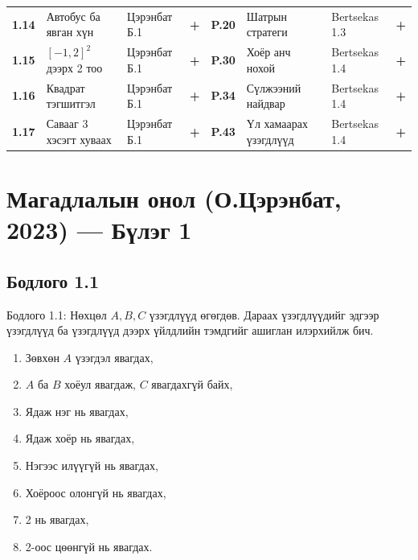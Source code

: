 \documentclass[11pt,a4paper]{article}
\newcommand{\checked}{\textcolor{success}{\textbf{+}}}
\begin{document}
{\begin{center}
\begin{tabularx}{\textwidth}{@{}c X l c | c X l c@{}}
\textbf{1.14} & Автобус ба явган хүн & Цэрэнбат Б.1 & \checked & \textbf{P.20} & Шатрын стратеги & Bertsekas 1.3 & \checked \\
\textbf{1.15} & \texorpdfstring{$[-1,2]^2$}{[-1,2]^2} дээрх 2 тоо & Цэрэнбат Б.1 & \checked & \textbf{P.30} & Хоёр анч нохой & Bertsekas 1.4 & \checked \\
\textbf{1.16} & Квадрат тэгшитгэл & Цэрэнбат Б.1 & \checked & \textbf{P.34} & Сүлжээний найдвар & Bertsekas 1.4 & \checked \\
\textbf{1.17} & Савааг 3 хэсэгт хуваах & Цэрэнбат Б.1 & \checked & \textbf{P.43} & Үл хамаарах үзэгдлүүд & Bertsekas 1.4 & \checked \\
\bottomrule
\end{tabularx}
\end{center}
}

\vspace{0.3em}
{\hypersetup{linkcolor=navy}\tableofcontents}

\clearpage

\section[Цэрэнбат (2023) — Бүлэг 1]{Магадлалын онол (О.Цэрэнбат, 2023) — Бүлэг 1}

\subsection*{Бодлого 1.1}

\begin{problembox}{Бодлого 1.1: Нөхцөл}
$A, B, C$ үзэгдлүүд өгөгдөв. Дараах үзэгдлүүдийг эдгээр үзэгдлүүд ба үзэгдлүүд дээрх үйлдлийн тэмдгийг ашиглан илэрхийлж бич.
\begin{enumerate}[label=\textbf{\alph*)}, leftmargin=1.8em, itemsep=1pt]
  \item Зөвхөн $A$ үзэгдэл явагдах,
  \item $A$ ба $B$ хоёул явагдаж, $C$ явагдахгүй байх,
  \item Ядаж нэг нь явагдах,
  \item Ядаж хоёр нь явагдах,
  \item Нэгээс илүүгүй нь явагдах,
  \item Хоёроос олонгүй нь явагдах,
  \item 2 нь явагдах,
  \item 2-оос цөөнгүй нь явагдах.
\end{enumerate}
\end{problembox}
\end{document}
